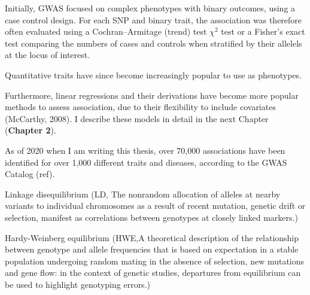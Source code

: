 Initially, GWAS focused on complex phenotypes with binary outcomes, using a case control design. 
For each SNP and binary trait, the association was therefore often evaluated using a Cochran–Armitage (trend) test
$\chi^2$ test or a Fisher's exact test comparing the numbers of cases and controls when stratified by their allelels at the locus of interest.

Quantitative traits have since become increasingly popular to use as phenotypes. 

Furthermore, linear regressions and their derivations have become more popular methods to assess association, due to their flexibility to include covariates (McCarthy, 2008).
I describe these models in detail in the next Chapter (\textbf{Chapter 2}). 

As of 2020 when I am writing this thesis, over 70,000 associations have been identified for over 1,000 different traits and diseases, according to the GWAS Catalog (ref).

Linkage disequilibrium (LD, The nonrandom allocation of alleles at nearby variants to individual chromosomes as a result of recent mutation, genetic drift or selection, manifest as correlations between genotypes at closely linked markers.)

Hardy-Weinberg equilibrium (HWE,A theoretical description of the relationship between genotype and allele frequencies that is based on expectation in a stable population undergoing random mating in the absence of selection, new mutations and gene flow: in the context of genetic studies, departures from equilibrium can be used to highlight genotyping errors.)

